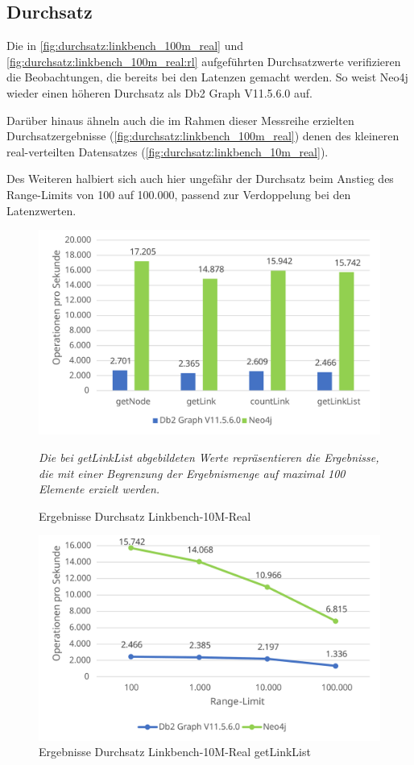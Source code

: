 \subsection{Durchsatz}
Die in \autoref{fig:durchsatz:linkbench_100m_real} und \autoref{fig:durchsatz:linkbench_100m_real:rl} aufgeführten Durchsatzwerte verifizieren die Beobachtungen, die bereits bei den Latenzen gemacht werden. So weist Neo4j wieder einen höheren Durchsatz als Db2 Graph V11.5.6.0 auf.

Darüber hinaus ähneln auch die im Rahmen dieser Messreihe erzielten Durchsatzergebnisse (\autoref{fig:durchsatz:linkbench_100m_real}) denen des kleineren real-verteilten Datensatzes (\autoref{fig:durchsatz:linkbench_10m_real}).

Des Weiteren halbiert sich auch hier ungefähr der Durchsatz beim Anstieg des Range-Limits von 100 auf 100.000, passend zur Verdoppelung bei den Latenzwerten.

\begin{figure}[!ht]
    \centering
    \includegraphics[width=\textwidth]{images/diagramme/linkbench_100m_real_durchsatz.pdf}
    \caption{Ergebnisse Durchsatz Linkbench-10M-Real}
    \label{fig:durchsatz:linkbench_100m_real}
    \vspace{1em}
    \textit{Die bei getLinkList abgebildeten Werte repräsentieren die Ergebnisse, die mit einer Begrenzung der Ergebnismenge auf maximal 100 Elemente erzielt werden.}
\end{figure}

\begin{figure}[!ht]
    \centering
    \includegraphics[width=\textwidth]{images/diagramme/limit_absolute_durchsatz_real_100m.pdf}
    \caption{Ergebnisse Durchsatz Linkbench-10M-Real getLinkList}
    \label{fig:durchsatz:linkbench_100m_real:rl}
\end{figure}
